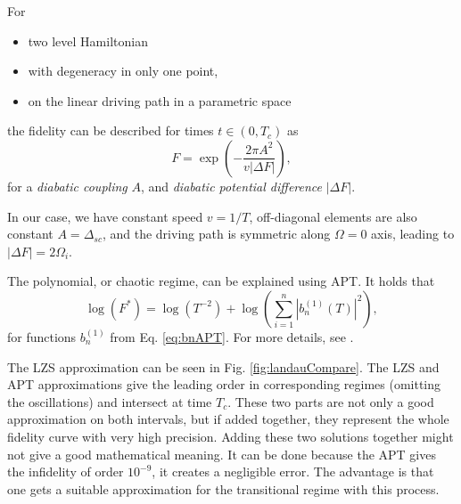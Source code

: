 \begin{thm}
    For 
    \begin{itemize}
        \item two level Hamiltonian
        \item with degeneracy in only one point,
        \item on the linear driving path in a parametric space
    \end{itemize}
    the fidelity can be described for times $t\in(0,T_c)$ as
    \begin{equation}
        F = \exp\left(-\frac{2 \pi A^2}{v|\Delta F|}\right),
        \label{eq:exponentialPart}
    \end{equation}
    for a \emph{diabatic coupling} $A$, and \emph{diabatic potential difference} $|\Delta F|$. 
\end{thm}

In our case, we have constant speed $v=1/T$, off-diagonal elements are also constant $A=\Delta_{sc}$, and the driving path is symmetric along $\Omega=0$ axis, leading to $|\Delta F|=2\Omega_i$.

The polynomial, or chaotic regime, can be explained using APT. It holds that
\begin{equation}
    \log(F^*)=\log(T^{-2})+\log\left(\sum_{i=1}^n |b_n^{(1)}(T)|^2\right),
    \label{eq:polynomialPart}
\end{equation}
for functions $b_n^{(1)}$ from Eq. \ref{eq:bnAPT}. For more details, see \cite{felipe}.

The LZS approximation can be seen in Fig. \ref{fig:landauCompare}. The LZS and APT approximations give the leading order in corresponding regimes (omitting the oscillations) and intersect at time $T_c$. These two parts are not only a good approximation on both intervals, but if added together, they represent the whole fidelity curve with very high precision. Adding these two solutions together might not give a good mathematical meaning. It can be done because the APT gives the infidelity of order $10^{-9}$, it creates a negligible error. The advantage is that one gets a suitable approximation for the transitional regime with this process.


